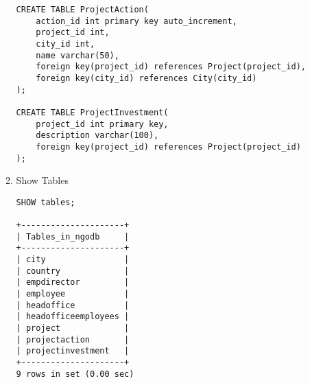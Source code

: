 \documentclass[]{article}
\begin{document}
\begin{enumerate}
\begin{enumerate}
\begin{verbatim}
CREATE TABLE ProjectAction(
	action_id int primary key auto_increment,
	project_id int,
	city_id int,
	name varchar(50),
	foreign key(project_id) references Project(project_id),
	foreign key(city_id) references City(city_id)
);

CREATE TABLE ProjectInvestment(
	project_id int primary key,
	description varchar(100),
	foreign key(project_id) references Project(project_id)
);
\end{verbatim}

\item Show Tables
\begin{verbatim}
SHOW tables;

+---------------------+
| Tables_in_ngodb     |
+---------------------+
| city                |
| country             |
| empdirector         |
| employee            |
| headoffice          |
| headofficeemployees |
| project             |
| projectaction       |
| projectinvestment   |
+---------------------+
9 rows in set (0.00 sec)
\end{verbatim}
\end{enumerate}

\end{enumerate}
\end{document}
